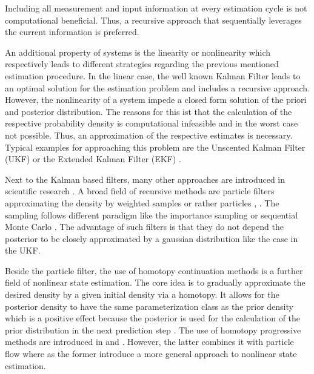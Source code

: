 \documentclass[a4paper]{IEEEtran}
\begin{document}
Including all measurement and input information at every estimation cycle is not computational beneficial. Thus, a recursive approach that sequentially leverages the current information is preferred.

An additional property of systems is the linearity or nonlinearity which respectively leads to different strategies regarding the previous mentioned estimation procedure.
In the linear case, the well known Kalman Filter \cite{Kalman1960} leads to an optimal solution for the estimation problem and includes a recursive approach. However, the nonlinearity of a system
impede a closed form solution of the priori and posterior distribution. The reasons for this ist that the calculation of the respective probability density is computational infeasible and in the worst case not
possible. Thus, an approximation of the respective estimates is necessary. Typical examples for approaching this problem are the Unscented Kalman Filter (UKF) \cite{julier2004} or the Extended Kalman Filter (EKF) \cite{jazwinski2007}.

Next to the Kalman based filters, many other approaches are introduced in scientific research \cite{daum2005}. A broad field of recursive methods are particle filters approximating the density by weighted samples or rather particles \cite{arulampalam2002}, \cite{crisan2002}. 
The sampling follows different paradigm like the importance sampling or sequential Monte Carlo \cite{cappe2007b}. The advantage of such filters is that they do not depend the posterior to be closely approximated by a gaussian distribution \cite{cappe2007b} like the 
case in the UKF.

Beside the particle filter, the use of homotopy continuation methods is a further field of nonlinear state estimation. The core idea is to gradually approximate the desired density by a given initial density via a homotopy. 
It allows for the posterior density to have the same parameterization class as the prior density which is a positive effect because the posterior is used for the calculation of the prior distribution in the next prediction step \cite{hagmar2011}. 
The use of homotopy progressive methods are introduced in \cite{hanebeck2003} and \cite{daum2005}. However, the latter combines it with particle flow where as the former introduce a more general approach to nonlinear state estimation.
\end{document}
